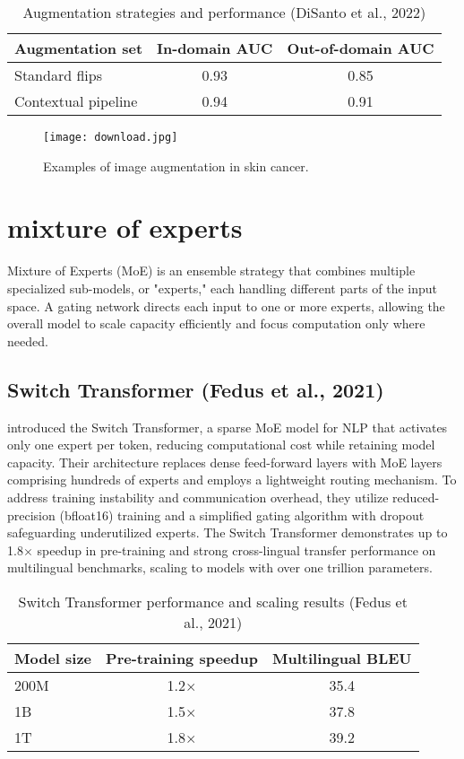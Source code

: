 \begin{table}[h!]
  \centering
  \caption{Augmentation strategies and performance (DiSanto et al., 2022)}
  \label{tab:disanto-results}
  \begin{tabular}{lcc}
    \hline
    Augmentation set & In-domain AUC & Out-of-domain AUC \\
    \hline
    Standard flips & 0.93 & 0.85 \\
    Contextual pipeline & 0.94 & 0.91 \\
    \hline
  \end{tabular}
\end{table}

\begin{figure}[ht]
  \centering
  \texttt{[image: download.jpg]}
  \caption{Examples of image augmentation in skin cancer.}
  \label{fig:disanto-aug}
\end{figure}

\section{mixture of experts}
Mixture of Experts (MoE) is an ensemble strategy that combines multiple specialized sub-models, or "experts," each handling different parts of the input space. A gating network directs each input to one or more experts, allowing the overall model to scale capacity efficiently and focus computation only where needed.

\subsection{Switch Transformer (Fedus et al., 2021)}
\textcite{fedus2021switch} introduced the Switch Transformer, a sparse MoE model for NLP that activates only one expert per token, reducing computational cost while retaining model capacity. Their architecture replaces dense feed-forward layers with MoE layers comprising hundreds of experts and employs a lightweight routing mechanism. To address training instability and communication overhead, they utilize reduced-precision (bfloat16) training and a simplified gating algorithm with dropout safeguarding underutilized experts. The Switch Transformer demonstrates up to 1.8$\times$ speedup in pre-training and strong cross-lingual transfer performance on multilingual benchmarks, scaling to models with over one trillion parameters.

\begin{table}[h!]
  \centering
  \caption{Switch Transformer performance and scaling results (Fedus et al., 2021)}
  \label{tab:switch-transformer}
  \begin{tabular}{lcc}
    \hline
    Model size & Pre-training speedup & Multilingual BLEU \\
    \hline
    200M & 1.2$\times$ & 35.4 \\
    1B & 1.5$\times$ & 37.8 \\
    1T & 1.8$\times$ & 39.2 \\
    \hline
  \end{tabular}
\end{table}

